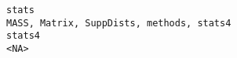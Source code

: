 \documentclass[
  letterpaper,
  DIV=11,
  numbers=noendperiod]{scrreprt}
\begin{document}
\begin{verbatim}
stats                                                                                                                                                                                                                                                                                                                                                                                                                                                                                                                                                                                                                                                                                                                                                                                                                                                                                                                                                                                                                                                                                                                                                                                                                                                                MASS, Matrix, SuppDists, methods, stats4
stats4                                                                                                                                                                                                                                                                                                                                                                                                                                                                                                                                                                                                                                                                                                                                                                                                                                                                                                                                                                                                                                                                                                                                                                                                                                                                                                   <NA>

\end{verbatim}
\end{document}
